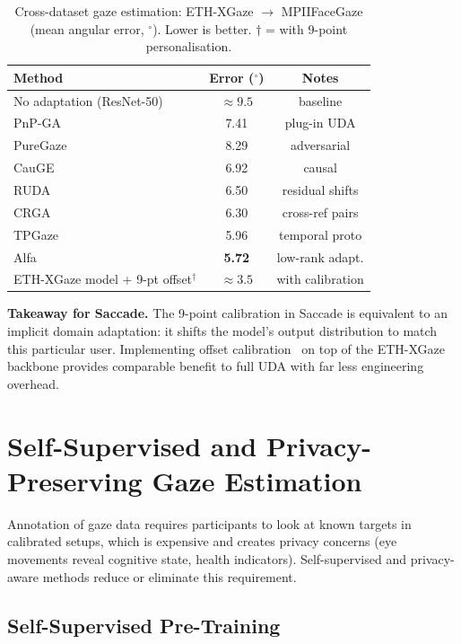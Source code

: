 \documentclass[11pt,a4paper]{article}
\begin{document}
\begin{table}[h]
\centering
\caption{Cross-dataset gaze estimation: ETH-XGaze $\to$ MPIIFaceGaze (mean angular error, $^\circ$).
Lower is better. $\dagger$ = with 9-point personalisation.}
\label{tab:domain}
\begin{tabular}{lcc}
\hline
\textbf{Method} & \textbf{Error ($^\circ$)} & \textbf{Notes} \\
\hline
No adaptation (ResNet-50) & $\approx9.5$ & baseline \\
PnP-GA~\cite{liu2021pnpga} & 7.41 & plug-in UDA \\
PureGaze~\cite{cheng2022puregaze} & 8.29 & adversarial \\
CauGE~\cite{wang2022cauge} & 6.92 & causal \\
RUDA~\cite{bao2022ruda} & 6.50 & residual shifts \\
CRGA~\cite{li2022crga} & 6.30 & cross-ref pairs \\
TPGaze~\cite{cai2023tpgaze} & 5.96 & temporal proto \\
Alfa~\cite{qin2024alfa} & \textbf{5.72} & low-rank adapt. \\
\hline
ETH-XGaze model + 9-pt offset$^\dagger$ & $\approx3.5$ & with calibration \\
\hline
\end{tabular}
\end{table}

\noindent\textbf{Takeaway for Saccade.}
The 9-point calibration in Saccade is equivalent to an implicit domain adaptation:
it shifts the model's output distribution to match this particular user.
Implementing offset calibration~\cite{chen2020offset} on top of the ETH-XGaze backbone
provides comparable benefit to full UDA with far less engineering overhead.

\section{Self-Supervised and Privacy-Preserving Gaze Estimation}
\label{sec:selfsup}

Annotation of gaze data requires participants to look at known targets in calibrated setups,
which is expensive and creates privacy concerns (eye movements reveal cognitive state, health indicators).
Self-supervised and privacy-aware methods reduce or eliminate this requirement.

\subsection{Self-Supervised Pre-Training}
\end{document}
